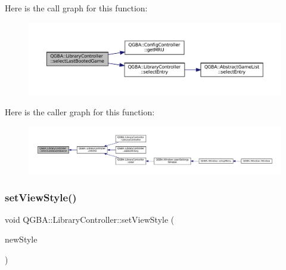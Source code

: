 Here is the call graph for this function\+:
\nopagebreak
\begin{figure}[H]
\begin{center}
\leavevmode
\includegraphics[width=350pt]{class_q_g_b_a_1_1_library_controller_a31c1c6683f5f348b623da642dbd1f5e1_cgraph}
\end{center}
\end{figure}
Here is the caller graph for this function\+:
\nopagebreak
\begin{figure}[H]
\begin{center}
\leavevmode
\includegraphics[width=350pt]{class_q_g_b_a_1_1_library_controller_a31c1c6683f5f348b623da642dbd1f5e1_icgraph}
\end{center}
\end{figure}
\mbox{\label{class_q_g_b_a_1_1_library_controller_a03b3f54bcf12e4be753ccceef5ee0937}} 
\subsubsection{\texorpdfstring{set\+View\+Style()}{setViewStyle()}}
{\footnotesize\ttfamily void Q\+G\+B\+A\+::\+Library\+Controller\+::set\+View\+Style (\begin{DoxyParamCaption}\item[{\mbox{\hyperlink{namespace_q_g_b_a_a4804d48d02699a2c1d2436e9269a8bb8}{Library\+Style}}}]{new\+Style }\end{DoxyParamCaption})}

